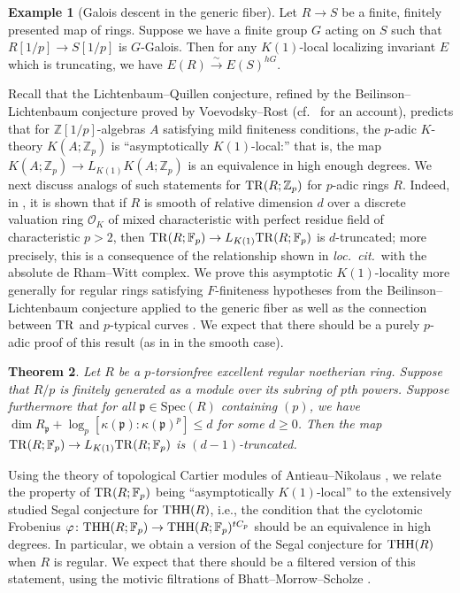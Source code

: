 \documentclass{amsart}
\newtheorem{theorem}{Theorem}[section]
\theoremstyle{definition}
\newcommand{\spec}{\mathrm{Spec}}
\newtheorem{example}[theorem]{Example}
\begin{document}
\begin{example}[Galois descent in the generic fiber] 
\label{galoisgenericex}
Let $R \to S$ be a finite, finitely presented map of rings. 
Suppose we have a finite group $G$ acting on $S$ such that $R[1/p] \to S[1/p]$
is $G$-Galois. Then 
for any $K(1)$-local localizing invariant $E$ which is truncating, we have
\( E(R) \xrightarrow{\sim} E(S)^{hG}.  \)
\end{example} 



Recall that the Lichtenbaum--Quillen conjecture, refined by the
Beilinson--Lichtenbaum conjecture proved by Voevodsky--Rost (cf.~\cite{HW19}
for an account), predicts that for 
$\mathbb{Z}[1/p]$-algebras $A$ satisfying 
mild finiteness conditions, the $p$-adic $K$-theory $K(A; \mathbb{Z}_p)$ is
``asymptotically $K(1)$-local:'' that is, the map $K(A; \mathbb{Z}_p) \to
L_{K(1)} K(A; \mathbb{Z}_p)$ is an equivalence in high enough degrees. 
We next discuss analogs of such statements for $\mathrm{TR}(R; \mathbb{Z}_p)$ for $p$-adic
rings $R$. 
Indeed, 
in \cite{HM03, HM04}, it is shown that
if $R$ is smooth of relative dimension $d$ over a discrete valuation ring $\mathcal{O}_K$ of mixed
characteristic  with perfect
residue field of characteristic $p > 2$, then 
$\mathrm{TR}(R; \mathbb{F}_p) \to L_{K(1)} \mathrm{TR}(R; \mathbb{F}_p)$ is $d$-truncated; more
precisely, this is a consequence of the relationship shown in \emph{loc.~cit.}~with the absolute de Rham--Witt complex. 
We prove this asymptotic $K(1)$-locality more generally for regular rings satisfying $F$-finiteness
hypotheses
from the Beilinson--Lichtenbaum conjecture  applied to the generic fiber as well as the connection between $\mathrm{TR}$ and $p$-typical curves
\cite{Hes96}. We expect that there should be a purely $p$-adic proof of
this result (as in \cite{HM03, HM04} in the smooth case).  

\begin{theorem} 
Let $R$ be a $p$-torsionfree excellent regular noetherian ring. Suppose that $R/p$ is finitely generated
as a module over its subring of $p$th powers. 
Suppose furthermore that
for all $\mathfrak{p} \in \spec(R)$ containing $(p)$, we have
$\dim R_{\mathfrak{p}} + \log_p [ \kappa(\mathfrak{p}):\kappa(\mathfrak{p})^p]
\leq d$ for some $d \geq 0$. 
Then the map $\mathrm{TR}(R; \mathbb{F}_p) \to L_{K(1)} \mathrm{TR}(R; \mathbb{F}_p)$ is 
$(d-1)$-truncated. 
\label{TRtruncapprox}
\end{theorem} 

Using the theory of topological Cartier modules of Antieau--Nikolaus \cite{AN}, we relate 
the property of $\mathrm{TR}(R; \mathbb{F}_p)$ being ``asymptotically $K(1)$-local'' to
the extensively studied Segal
conjecture for $\mathrm{THH}(R)$, i.e., the condition that the cyclotomic
Frobenius $\varphi \colon \mathrm{THH}(R; \mathbb{F}_p) \to \mathrm{THH}(R;
\mathbb{F}_p)^{tC_p}$
should be an equivalence in high degrees. 
In particular, we obtain a version of the Segal conjecture for $\mathrm{THH}(R)$ when
$R$ is regular. 
We expect that there should be a filtered version of this
statement, using the motivic filtrations of Bhatt--Morrow--Scholze \cite{BMS2}. 
\end{document}
